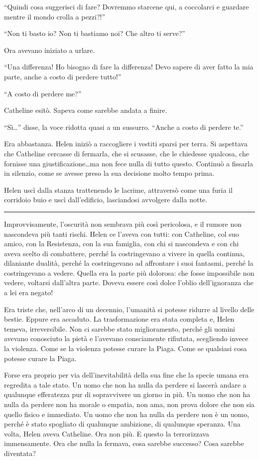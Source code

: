 ``Quindi cosa suggerisci di fare? Dovremmo starcene qui, a coccolarci e guardare mentre il mondo
crolla a pezzi?!''

``Non ti basto io? Non ti bastiamo noi? Che altro ti serve?''

Ora avevano iniziato a urlare.

``Una differenza! Ho bisogno di fare la differenza! Devo sapere di aver fatto la mia parte, anche a
costo di perdere tutto!''

``A costo di perdere me?''

Catheline esitò. Sapeva come sarebbe andata a finire.

``Sì\dots'' disse, la voce ridotta quasi a un sussurro. ``Anche a costo di perdere te.''

Era abbastanza. Helen iniziò a raccogliere i vestiti sparsi per terra. Si aspettava che Catheline
cercasse di fermarla, che si scusasse, che le chiedesse qualcosa, che fornisse una
giustificazione\dots ma non fece nulla di tutto questo. Continuò a fissarla in silenzio, come se
avesse preso la sua decisione molto tempo prima.

Helen uscì dalla stanza trattenendo le lacrime, attraversò come una furia il corridoio buio e uscì
dall'edificio, lasciandosi avvolgere dalla notte.

\plainbreak{1}

Improvvisamente, l'oscurità non sembrava più così pericolosa, e il rumore non nascondeva più tanti
rischi. Helen ce l'aveva con tutti: con Catheline, col suo amico, con la Resistenza, con la sua
famiglia, con chi si nascondeva e con chi aveva scelto di combattere, perché la costringevano a
vivere in quella continua, dilaniante dualità, perché la costringevano ad affrontare i suoi
fantasmi, perché la costringevano a vedere. Quella era la parte più dolorosa: che fosse impossibile
non vedere, voltarsi dall'altra parte. Doveva essere così dolce l'oblio dell'ignoranza che a lei era
negato!

Era triste che, nell'arco di un decennio, l'umanità si potesse ridurre al livello delle bestie.
Eppure era accaduto. La trasformazione era stata completa e, Helen temeva, irreversibile. Non ci
sarebbe stato miglioramento, perché gli uomini avevano conosciuto la pietà e l'avevano consciamente
rifiutata, scegliendo invece la violenza. Come se la violenza potesse curare la Piaga. Come se
qualsiasi cosa potesse curare la Piaga.

Forse era proprio per via dell'inevitabilità della sua fine che la specie umana era regredita a tale
stato. Un uomo che non ha nulla da perdere si lascerà andare a qualunque efferatezza pur di
sopravvivere un giorno in più. Un uomo che non ha nulla da perdere non ha morale o empatia, non ama,
non prova dolore che non sia quello fisico e immediato. Un uomo che non ha nulla da perdere non è un
uomo, perché è stato spogliato di qualunque ambizione, di qualunque speranza. Una volta, Helen aveva
Catheline. Ora non più. E questo la terrorizzava immensamente. Ora che nulla la fermava, cosa
sarebbe successo? Cosa sarebbe diventata?

